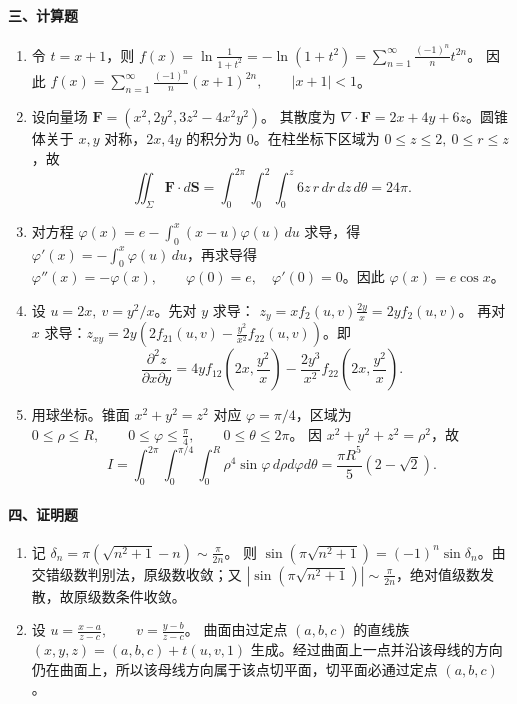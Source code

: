 \paragraph*{三、计算题}
\begin{enumerate}
  \item 令 $t=x+1$，则 \(\displaystyle f(x)=\ln\frac1{1+t^2}=-\ln(1+t^2)
  =\sum_{n=1}^{\infty}\frac{(-1)^n}{n}t^{2n}\)。
  因此
  \(\displaystyle f(x)=\sum_{n=1}^{\infty}\frac{(-1)^n}{n}(x+1)^{2n},\qquad |x+1|<1\)。
  \item 设向量场
  \(\displaystyle \mathbf F=(x^2,2y^2,3z^2-4x^2y^2)\)。
  其散度为 \(\displaystyle \nabla\cdot\mathbf F=2x+4y+6z\)。圆锥体关于 $x,y$ 对称，$2x,4y$ 的积分为 $0$。在柱坐标下区域为 $0\le z\le2,\ 0\le r\le z$，故
  \[
  \iint_{\Sigma}\mathbf F\cdot d\mathbf S
  =\int_0^{2\pi}\int_0^2\int_0^z6z\,r\,dr\,dz\,d\theta
  =24\pi.
  \]
  \item 对方程 \(\displaystyle \varphi(x)=e-\int_0^x(x-u)\varphi(u)\,du\)
  求导，得 $\varphi'(x)=-\int_0^x\varphi(u)\,du$，再求导得
  \(\displaystyle \varphi''(x)=-\varphi(x),\qquad \varphi(0)=e,\quad \varphi'(0)=0\)。因此
  \(\displaystyle \varphi(x)=e\cos x\)。
  \item 设 $u=2x,\ v=y^2/x$。先对 $y$ 求导：
  \(\displaystyle z_y=x f_2(u,v)\frac{2y}{x}=2y f_2(u,v)\)。
  再对 $x$ 求导：\(\displaystyle z_{xy}=2y\left(2f_{21}(u,v)-\frac{y^2}{x^2}f_{22}(u,v)\right)\)。即
  \[
  \frac{\partial^2z}{\partial x\partial y}
  =4y f_{12}\left(2x,\frac{y^2}{x}\right)
  -\frac{2y^3}{x^2}f_{22}\left(2x,\frac{y^2}{x}\right).
  \]
  \item 用球坐标。锥面 $x^2+y^2=z^2$ 对应 $\varphi=\pi/4$，区域为
  \(\displaystyle 0\le\rho\le R,\qquad 0\le\varphi\le\frac{\pi}{4},\qquad 0\le\theta\le2\pi\)。
  因 $x^2+y^2+z^2=\rho^2$，故
  \[
  I=\int_0^{2\pi}\int_0^{\pi/4}\int_0^R\rho^4\sin\varphi\,d\rho d\varphi d\theta
  =\frac{\pi R^5}{5}(2-\sqrt2).
  \]
\end{enumerate}

\paragraph*{四、证明题}
\begin{enumerate}
  \item 记 \(\displaystyle \delta_n=\pi\left(\sqrt{n^2+1}-n\right)\sim\frac{\pi}{2n}\)。
  则 \(\displaystyle \sin\left(\pi\sqrt{n^2+1}\right)=(-1)^n\sin\delta_n\)。由交错级数判别法，原级数收敛；又
  \(\displaystyle \left|\sin\left(\pi\sqrt{n^2+1}\right)\right|\sim\frac{\pi}{2n}\)，绝对值级数发散，故原级数条件收敛。
  \item 设 \(\displaystyle u=\frac{x-a}{z-c},\qquad v=\frac{y-b}{z-c}\)。
  曲面由过定点 $(a,b,c)$ 的直线族
  \(\displaystyle (x,y,z)=(a,b,c)+t(u,v,1)\) 生成。经过曲面上一点并沿该母线的方向仍在曲面上，所以该母线方向属于该点切平面，切平面必通过定点 $(a,b,c)$。
\end{enumerate}

